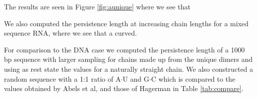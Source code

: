 The results are seen in Figure \ref{fig:aunique} where we see that

We also computed the persistence length at increasing chain lengths
for a mixed sequence RNA, where we see that a curved.


For comparison to the DNA case we computed the persistence length of a
1000 bp sequence with larger sampling for chains made up from the
unique dimers and using as rest state the values for a naturally
straight chain. We also constructed a random sequence with a
1:1 ratio of A$\cdot$U and G$\cdot$C which is compared to the
values obtained by Abels et al, and those of Hagerman in Table
\ref{tab:compare}. 
















